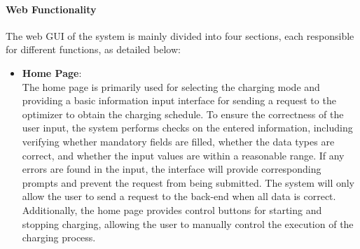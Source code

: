 \documentclass[
english,
ruledheaders=section,%
class=report,%
thesis={type=Report},%
accentcolor=9c,%
custommargins=true,%
marginpar=false,%
parskip=half-,%
fontsize=11pt,%
logofile={img/tuda_logo.pdf}, %
]{tudapub}
\begin{document}
        \paragraph{Web Functionality}
        The web GUI of the system is mainly divided into four sections, each responsible for different functions, as detailed below:
        \begin{itemize}
            \item \textbf{Home Page}:\\
            The home page is primarily used for selecting the charging mode and providing a basic information input interface for sending a request to the optimizer to obtain the charging schedule. To ensure the correctness of the user input, the system performs checks on the entered information, including verifying whether mandatory fields are filled, whether the data types are correct, and whether the input values are within a reasonable range. If any errors are found in the input, the interface will provide corresponding prompts and prevent the request from being submitted. The system will only allow the user to send a request to the back-end when all data is correct. Additionally, the home page provides control buttons for starting and stopping charging, allowing the user to manually control the execution of the charging process.
        \end{itemize}

\end{document}
